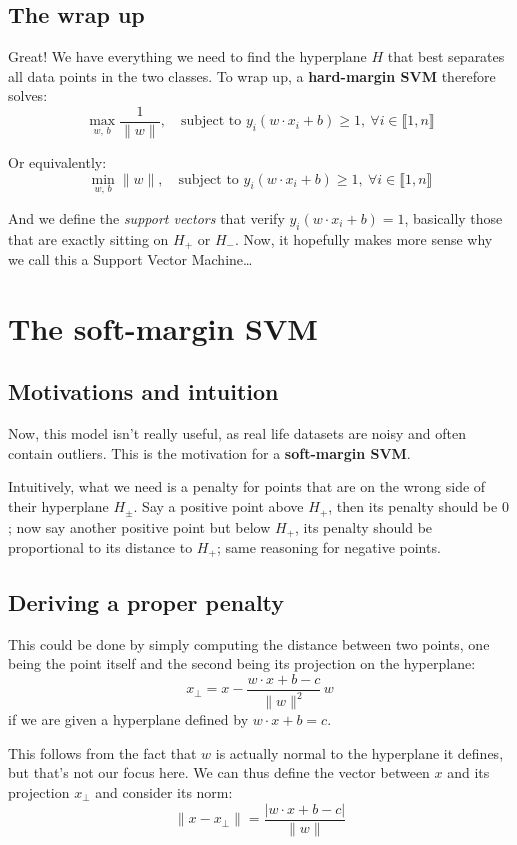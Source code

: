 \documentclass[12pt,a4paper]{article}
\begin{document}
\subsection{The wrap up}

Great! We have everything we need to find the hyperplane $H$ that best separates all data points in the two classes. To wrap up, a \textbf{hard-margin SVM} therefore solves:
\[
\max_{w,\,b} \frac{1}{\|w\|}, \quad \text{subject to } y_i(w \cdot x_i + b) \geq 1,\ \forall i \in \llbracket 1, n \rrbracket
\]

Or equivalently:
\[
\min_{w,\,b} \|w\|, \quad \text{subject to } y_i(w \cdot x_i + b) \geq 1,\ \forall i \in \llbracket 1, n \rrbracket
\]

And we define the \emph{support vectors} that verify $y_i(w \cdot x_i + b) = 1$, basically those that are exactly sitting on $H_+$ or $H_-$. Now, it hopefully makes more sense why we call this a Support Vector Machine\ldots

\section{The soft-margin SVM}

\subsection{Motivations and intuition}

Now, this model isn't really useful, as real life datasets are noisy and often contain outliers. This is the motivation for a \textbf{soft-margin SVM}.

Intuitively, what we need is a penalty for points that are on the wrong side of their hyperplane $H_{\pm}$. Say a positive point above $H_+$, then its penalty should be $0$; now say another positive point but below $H_+$, its penalty should be proportional to its distance to $H_+$; same reasoning for negative points.

\subsection{Deriving a proper penalty}

This could be done by simply computing the distance between two points, one being the point itself and the second being its projection on the hyperplane:
\[
x_{\perp} = x - \frac{w \cdot x + b - c}{\|w\|^2}\, w
\]
if we are given a hyperplane defined by $w \cdot x + b = c$.

This follows from the fact that $w$ is actually normal to the hyperplane it defines, but that's not our focus here. We can thus define the vector between $x$ and its projection $x_{\perp}$ and consider its norm:
\[
\|x - x_{\perp}\| = \frac{|w \cdot x + b - c|}{\|w\|}
\]
\end{document}

